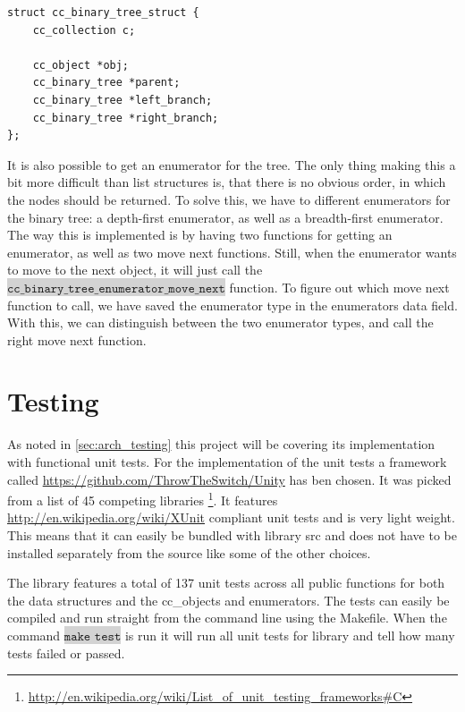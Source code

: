 \documentclass[table]{ituthesis}
\newcommand{\highlight}[1]{\colorbox{lightGray}{$\displaystyle \texttt{#1}$}}
\begin{document}
\begin{lstlisting}[label=cc_binary_tree-struct,caption=Internal representation of Binary Tree]
struct cc_binary_tree_struct {
	cc_collection c;
	
	cc_object *obj;
	cc_binary_tree *parent;
	cc_binary_tree *left_branch;
	cc_binary_tree *right_branch;
};
\end{lstlisting}

It is also possible to get an enumerator for the tree. The only thing making this a bit more difficult than list structures is, that there is no obvious order, in which the nodes should be returned. To solve this, we have to different enumerators for the binary tree: a depth-first enumerator, as well as a breadth-first enumerator. The way this is implemented is by having two functions for getting an enumerator, as well as two move next functions. Still, when the enumerator wants to move to the next object, it will just call the \highlight{cc\_binary\_tree\_enumerator\_move\_next} function. To figure out which move next function to call, we have saved the enumerator type in the enumerators data field. With this, we can distinguish between the two enumerator types, and call the right move next function.
	

\section{Testing}

	As noted in \autoref{sec:arch_testing} this project will be covering its implementation with functional unit tests. For the implementation of the unit tests a framework called \href{Unity}{https://github.com/ThrowTheSwitch/Unity} has ben chosen. It was picked from a list of 45 competing libraries \footnote{\href{http://en.wikipedia.org/wiki/List\_of\_unit\_testing\_frameworks\#C}{http://en.wikipedia.org/wiki/List\_of\_unit\_testing\_frameworks\#C}}. It features \href{xUnit}{http://en.wikipedia.org/wiki/XUnit} compliant unit tests and is very light weight. This means that it can easily be bundled with library src and does not have to be installed separately from the source like some of the other choices.

	The library features a total of 137 unit tests across all public functions for both the data structures and the cc\_objects and enumerators. The tests can easily be compiled and run straight from the command line using the Makefile. When the command \highlight{make test} is run it will run all unit tests for library and tell how many tests failed or passed.
	
\end{document}
